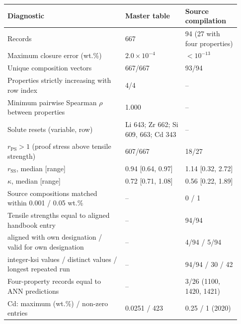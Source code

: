 \begin{tabular}{@{}p{0.47\linewidth}p{0.24\linewidth}p{0.22\linewidth}@{}}
\toprule
Diagnostic & Master table & Source compilation \\
\midrule
Records & 667 & 94 (27 with four properties) \\
Maximum closure error (wt.\%) & $2.0\times10^{-4}$ & $<10^{-13}$ \\
Unique composition vectors & 667/667 & 93/94 \\
Properties strictly increasing with row index & 4/4 & -- \\
Minimum pairwise Spearman $\rho$ between properties & 1.000 & -- \\
Solute resets (variable, row) & Li 643; Zr 662; Si 609, 663; Cd 343 & -- \\
$r_{\mathrm{PS}} > 1$ (proof stress above tensile strength) & 607/667 & 18/27 \\
$r_{\mathrm{SS}}$, median [range] & 0.94 [0.64, 0.97] & 1.14 [0.32, 2.72] \\
$\kappa$, median [range] & 0.72 [0.71, 1.08] & 0.56 [0.22, 1.89] \\
Source compositions matched within 0.001 / 0.05 wt.\% & -- & 0 / 1 \\
Tensile strengths equal to aligned handbook entry & -- & 94/94 \\
\quad aligned with own designation / valid for own designation & -- & 4/94 / 5/94 \\
\quad integer-ksi values / distinct values / longest repeated run & -- & 94/94 / 30 / 42 \\
Four-property records equal to ANN predictions & -- & 3/26 (1100, 1420, 1421) \\
Cd: maximum (wt.\%) / non-zero entries & 0.0251 / 423 & 0.25 / 1 (2020) \\
\bottomrule
\end{tabular}
